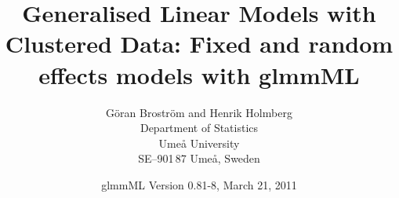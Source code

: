 \documentclass[a4paper,11pt]{article}
\author{G{\"o}ran Brostr{\"o}m and Henrik Holmberg \\
Department of Statistics \\
      Umeå University \\
      SE--901\,87 Umeå, Sweden}
\date{glmmML Version 0.81-8, March 21, 2011}
\begin{document}

\title{Generalised Linear Models with Clustered Data: 
Fixed and random effects models with glmmML}

\maketitle
\end{document}
